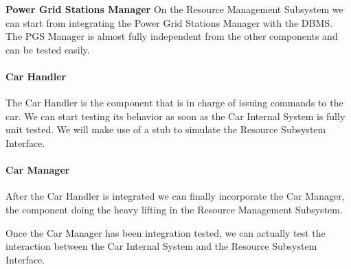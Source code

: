 \documentclass[english]{article}
\begin{document}
\textbf{Power Grid Stations Manager}
On the Resource Management Subsystem we can start from integrating the Power Grid Stations Manager with the DBMS.
The PGS Manager is almost fully independent from the other components and can be tested easily.
\begin{figure}[H]
	\centering
\end{figure}

\paragraph{Car Handler}
The Car Handler is the component that is in charge of issuing commands to the car. We can start testing its behavior as soon as the Car Internal System is fully unit tested. We will make use of a stub to simulate the Resource Subsystem Interface.

\begin{figure}[H]
	\centering
\end{figure}

\paragraph{Car Manager}
After the Car Handler is integrated we can finally incorporate the Car Manager, the component doing the heavy lifting in the Resource Management Subsystem.
\begin{figure}[H]
	\centering
\end{figure}

Once the Car Manager has been integration tested, we can actually test the interaction between the Car Internal System and the Resource Subsystem Interface.
\begin{figure}[H]
	\centering
\end{figure}
\end{document}
